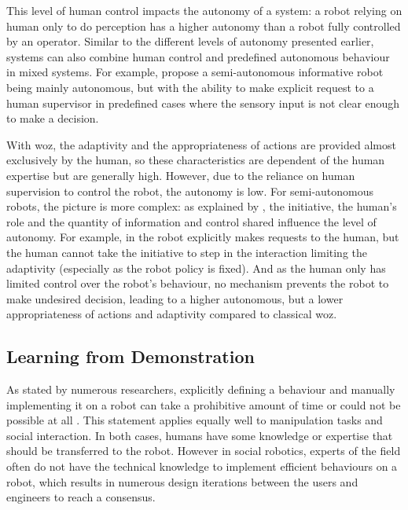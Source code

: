 	This level of human control impacts the autonomy of a system: a robot relying on human only to do perception has a higher autonomy than a robot fully controlled by an operator. Similar to the different levels of autonomy presented earlier, systems can also combine human control and predefined autonomous behaviour in mixed systems. For example, \citet{shiomi2008semi} propose a semi-autonomous informative robot being mainly autonomous, but with the ability to make explicit request to a human supervisor in predefined cases where the sensory input is not clear enough to make a decision. %
	
	With \gls{woz}, the adaptivity and the appropriateness of actions are provided almost exclusively by the human, so these characteristics are dependent of the human expertise but are generally high. However, due to the reliance on human supervision to control the robot, the autonomy is low. For semi-autonomous robots, the picture is more complex: as explained by \cite{beer2014toward}, the initiative, the human's role and the quantity of information and control shared influence the level of autonomy. For example, in \citet{shiomi2008semi} the robot explicitly makes requests to the human, but the human cannot take the initiative to step in the interaction limiting the adaptivity (especially as the robot policy is fixed). And as the human only has limited control over the robot's behaviour, no mechanism prevents the robot to make undesired decision, leading to a higher autonomous, but a lower appropriateness of actions and adaptivity compared to classical \gls{woz}.

\subsection{Learning from Demonstration} \label{ssec:back_lfd}
	As stated by numerous researchers, explicitly defining a behaviour and manually implementing it on a robot can take a prohibitive amount of time or could not be possible at all \citep{argall2009survey,billard2008robot,dautenhahn2004robots}. This statement applies equally well to manipulation tasks and social interaction. In both cases, humans have some knowledge or expertise that should be transferred to the robot. However in social robotics, experts of the field often do not have the technical knowledge to implement efficient behaviours on a robot, which results in numerous design iterations between the users and engineers to reach a consensus. 
	
